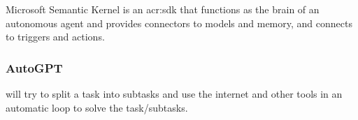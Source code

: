Microsoft Semantic Kernel is an \acrshort{acr:sdk} that functions as the brain of an autonomous agent and provides connectors to models and memory, and connects to triggers and actions.

\subsubsection{AutoGPT}\label{subsubsec:autogpt}

\cite{richardAutoGPTHeartOpensource2023} will try to split a task into subtasks and use the internet and other tools in an automatic loop to solve the task/subtasks.

\glsresetall